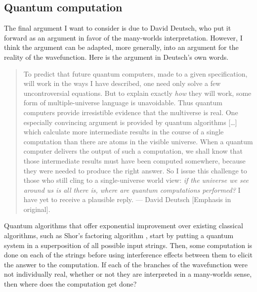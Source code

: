 \documentclass[DIV=calc,paper=a4,fontsize=11pt,twocolumn]{scrartcl} %
\theoremstyle{definition}
\theoremstyle{plain}
\begin{document}
\subsection{Quantum computation}

\label{QC}

The final argument I want to consider is due to David Deutsch, who put
it forward as an argument in favor of the many-worlds interpretation.
However, I think the argument can be adapted, more generally, into an
argument for the reality of the wavefunction.  Here is the argument in
Deutsch's own words.

\begin{quote}
To predict that future quantum computers, made to a given
specification, will work in the ways I have described, one need only
solve a few uncontroversial equations. But to explain exactly
\emph{how} they will work, some form of multiple-universe language
is unavoidable. Thus quantum computers provide irresistible evidence
that the multiverse is real. One especially convincing argument is
provided by quantum algorithms [\ldots] which calculate more
intermediate results in the course of a single computation than
there are atoms in the visible universe. When a quantum computer
delivers the output of such a computation, we shall know that those
intermediate results must have been computed somewhere, because they
were needed to produce the right answer. So I issue this challenge
to those who still cling to a single-universe world view: \emph{if
the universe we see around us is all there is, where are quantum
computations performed?} I have yet to receive a plausible
reply. --- David Deutsch \cite{Deutsch1998} [Emphasis in original].
\end{quote}

Quantum algorithms that offer exponential improvement over existing
classical algorithms, such as Shor's factoring algorithm
\cite{Shor1997}, start by putting a quantum system in a superposition
of all possible input strings.  Then, some computation is done on each
of the strings before using interference effects between them to
elicit the answer to the computation.  If each of the branches of the
wavefunction were not individually real, whether or not they are
interpreted in a many-worlds sense, then where does the computation
get done?
\end{document}
